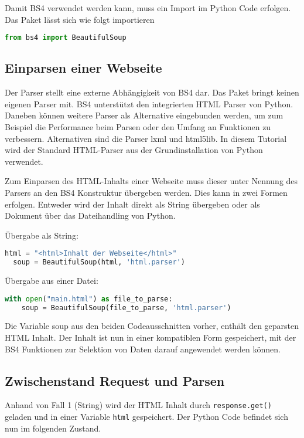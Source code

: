Damit BS4 verwendet werden kann, muss ein Import im Python Code erfolgen.
Das Paket lässt sich wie folgt importieren\:

\begin{lstlisting}[language=Python,gobble=2,label=lst:import]
  from bs4 import BeautifulSoup
\end{lstlisting}

\subsection{Einparsen einer Webseite}

Der Parser stellt eine externe Abhängigkeit von BS4 dar.
Das Paket bringt keinen eigenen Parser mit.
BS4 unterstützt den integrierten HTML Parser von Python.
Daneben können weitere Parser als Alternative eingebunden werden, um zum Beispiel die Performance beim Parsen oder den Umfang an Funktionen zu verbessern.
Alternativen sind die Parser lxml und html5lib.
In diesem Tutorial wird der Standard HTML-Parser aus der Grundinstallation von Python verwendet.

Zum Einparsen des HTML-Inhalts einer Webseite muss dieser unter Nennung des Parsers an den BS4 Konstruktur übergeben werden.
Dies kann in zwei Formen erfolgen. 
Entweder wird der Inhalt direkt als String übergeben oder als Dokument über das Dateihandling von Python.

Übergabe als String:
\begin{lstlisting}[language=Python,gobble=2]
  html = "<html>Inhalt der Webseite</html>"
  soup = BeautifulSoup(html, 'html.parser')
\end{lstlisting}

Übergabe aus einer Datei:
\begin{lstlisting}[language=Python,gobble=2]
  with open("main.html") as file_to_parse:
    soup = BeautifulSoup(file_to_parse, 'html.parser')
\end{lstlisting}

Die Variable soup aus den beiden Codeausschnitten vorher, enthält den geparsten HTML Inhalt.
Der Inhalt ist nun in einer kompatiblen Form gespeichert, mit der BS4 Funktionen zur Selektion von Daten darauf angewendet werden können.

\subsection{Zwischenstand Request und Parsen}

Anhand von Fall 1 (String) wird der HTML Inhalt durch \texttt{response.get()} geladen und in einer Variable \texttt{html} gespeichert.
Der Python Code befindet sich nun im folgenden Zustand.


